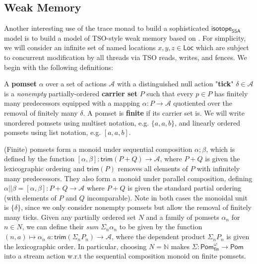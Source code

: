 \documentclass[acmsmall,screen,review]{acmart}
\newcommand{\mc}[1]{\ensuremath{\mathcal{#1}}}
\newcommand{\ms}[1]{\ensuremath{\mathsf{#1}}}
\newcommand{\nats}{\mathbb{N}}
\newcommand{\isotopessa}{\ms{isotope_{SSA}}}
\begin{document}
\subsection{Weak Memory}

Another interesting use of the trace monad to build a sophisticated \isotopessa
model is to build a model of TSO-style weak memory based on \citet{sparky}. For
simplicity, we will consider an infinite set of named locations \(x, y, z \in
\ms{Loc}\) which are subject to concurrent modification by all threads via TSO
reads, writes, and fences. We begin with the following definitions:
\begin{definition}[Pomset] 
  A \textbf{pomset} \(\alpha\) over a set of actions \(\mc{A}\) with a
  distinguished null action "\textbf{tick}" \(\delta \in \mc{A}\) is a
  \textit{nonempty} partially-ordered \textbf{carrier set} \(P\) such that every
  \(p \in P\) has finitely many predecessors equipped with a mapping \(\alpha: P
  \to \mc{A}\) quotiented over the removal of finitely many \(\delta\). A pomset
  is \textbf{finite} if its carrier set is. We will write unordered pomsets
  using multiset notation, e.g. \(\{a, a, b\}\), and linearly ordered pomsets
  using list notation, e.g. \([a, a, b]\).
\end{definition}
(Finite) pomsets form a monoid under sequential composition \(\alpha;\beta\),
which is defined by the function \([\alpha, \beta]: \ms{trim}(P + Q) \to
\mc{A}\), where \(P + Q\) is given the lexicographic ordering and
\(\ms{trim}(P)\) removes all elements of \(P\) with infinitely many
predecessors. They also form a monoid under parallel composition, defining
\(\alpha || \beta = [\alpha, \beta]: P + Q \to \mc{A}\) where \(P + Q\) is given
the standard partial ordering (with elements of \(P\) and \(Q\) incomparable).
Note in both cases the monoidal unit is \(\{\delta\}\), since we only consider
nonempty pomsets but allow the removal of finitely many ticks. Given any
partially ordered set \(N\) and a family of pomsets \(\alpha_n\) for \(n \in
N\), we can define their \textit{sum} \(\Sigma_n\alpha_n\) to be given by the
function \((n, a) \mapsto \alpha_n\;a: \ms{trim}(\Sigma_nP_n) \to \mc{A}\),
where the dependent product \(\Sigma_nP_n\) is given the lexicographic order. In
particular, choosing \(N = \nats\) makes \(\Sigma: \ms{Pom}_{\ms{fin}}^\omega
\to \ms{Pom}\) into a stream action w.r.t the sequential composition monoid on
finite pomsets. 
\end{document}
